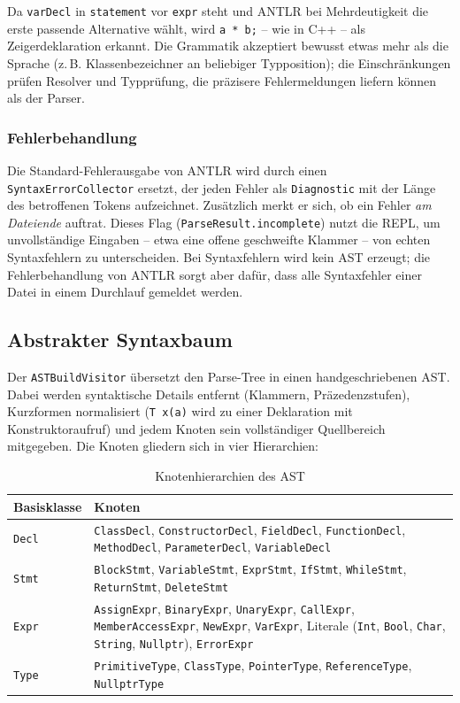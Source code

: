 \documentclass[11pt,a4paper,parskip=half,headsepline,toc=flat]{scrartcl}
\newcommand{\code}[1]{\texttt{#1}}
\newcommand{\thead}{\rowcolor{headbg}}
\newcommand{\hcell}[1]{\textbf{\color{navy}#1}}
\newenvironment{reporttable}[1][]%
  {\begin{table}[htbp]\centering\small\renewcommand{\arraystretch}{1.25}\rowcolors{2}{white}{zebra}}%
  {\end{table}}
\begin{document}
Da \code{varDecl} in \code{statement} vor \code{expr} steht und ANTLR bei Mehrdeutigkeit die erste passende
Alternative wählt, wird \code{a * b;} -- wie in C++ -- als Zeigerdeklaration erkannt. Die Grammatik akzeptiert bewusst
etwas mehr als die Sprache (z.\,B. Klassenbezeichner an beliebiger Typposition); die Einschränkungen prüfen Resolver
und Typprüfung, die präzisere Fehlermeldungen liefern können als der Parser.

\subsubsection*{Fehlerbehandlung}
Die Standard-Fehlerausgabe von ANTLR wird durch einen \code{SyntaxErrorCollector} ersetzt, der jeden Fehler als
\code{Diagnostic} mit der Länge des betroffenen Tokens aufzeichnet. Zusätzlich merkt er sich, ob ein Fehler \emph{am
Dateiende} auftrat. Dieses Flag (\code{ParseResult.incomplete}) nutzt die REPL, um unvollständige Eingaben -- etwa
eine offene geschweifte Klammer -- von echten Syntaxfehlern zu unterscheiden. Bei Syntaxfehlern wird kein AST
erzeugt; die Fehlerbehandlung von ANTLR sorgt aber dafür, dass alle Syntaxfehler einer Datei in einem Durchlauf
gemeldet werden.

\subsection{Abstrakter Syntaxbaum}
Der \code{ASTBuildVisitor} übersetzt den Parse-Tree in einen handgeschriebenen AST. Dabei werden syntaktische Details
entfernt (Klammern, Präzedenzstufen), Kurzformen normalisiert (\code{T x(a)} wird zu einer Deklaration mit
Konstruktoraufruf) und jedem Knoten sein vollständiger Quellbereich mitgegeben. Die Knoten gliedern sich in vier
Hierarchien:

\begin{reporttable}
\begin{tabular}{L{0.16}L{0.76}}
\thead \hcell{Basisklasse} & \hcell{Knoten} \\ \midrule
\code{Decl} & \code{ClassDecl}, \code{ConstructorDecl}, \code{FieldDecl}, \code{FunctionDecl}, \code{MethodDecl},
  \code{ParameterDecl}, \code{VariableDecl} \\
\code{Stmt} & \code{BlockStmt}, \code{VariableStmt}, \code{ExprStmt}, \code{IfStmt}, \code{WhileStmt},
  \code{ReturnStmt}, \code{DeleteStmt} \\
\code{Expr} & \code{AssignExpr}, \code{BinaryExpr}, \code{UnaryExpr}, \code{CallExpr}, \code{MemberAccessExpr},
  \code{NewExpr}, \code{VarExpr}, Literale (\code{Int}, \code{Bool}, \code{Char}, \code{String}, \code{Nullptr}),
  \code{ErrorExpr} \\
\code{Type} & \code{PrimitiveType}, \code{ClassType}, \code{PointerType}, \code{ReferenceType}, \code{NullptrType} \\
\bottomrule
\end{tabular}
\caption{Knotenhierarchien des AST}
\end{reporttable}
\end{document}
